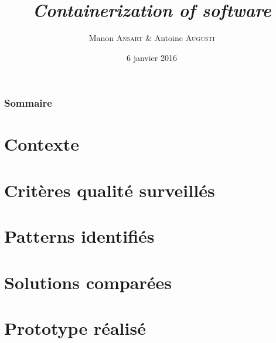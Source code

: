 \documentclass[handout]{beamer}
\title{
    \textit{Containerization of software}
}
\author{
    Manon \textsc{Ansart} \& Antoine \textsc{Augusti}
}
\date{6 janvier 2016}
\begin{document}
    \begin{frame}[plain]
        \titlepage
    \end{frame}

    \begin{frame}[plain]
        \frametitle{Sommaire}
        \tableofcontents
    \end{frame}

    \section{Contexte}
        

    \section{Critères qualité surveillés}
        

    \section{Patterns identifiés}
        

    \section{Solutions comparées}
        

    \section{Prototype réalisé}
        

\end{document}
